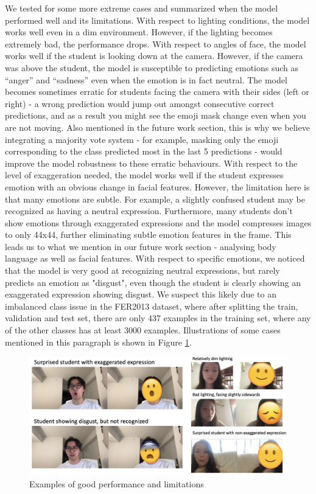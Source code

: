 \documentclass{article}
\begin{document}
We tested for some more extreme cases and summarized when the model performed well and its limitations. With respect to lighting conditions, the model works well even in a dim environment. However, if the lighting becomes extremely bad, the performance drops. With respect to angles of face, the model works well if the student is looking down at the camera. However, if the camera was above the student, the model is susceptible to predicting emotions such as ``anger'' and ``sadness'' even when the emotion is in fact neutral. The model becomes sometimes erratic for students facing the camera with their sides (left or right) - a wrong prediction would jump out amongst consecutive correct predictions, and as a result you might see the emoji mask change even when you are not moving. Also mentioned in the future work section, this is why we believe integrating a majority vote system - for example, masking only the emoji corresponding to the class predicted most in the last 5 predictions - would improve the model robustness to these erratic behaviours. With respect to the level of exaggeration needed, the model works well if the student expresses emotion with an obvious change in facial features. However, the limitation here is that many emotions are subtle. For example, a slightly confused student may be recognized as having a neutral expression. Furthermore, many students don't show emotions through exaggerated expressions and the model compresses images to only 44x44, further eliminating subtle emotion features in the frame. This leads us to what we mention in our future work section - analysing body language as well as facial features. With respect to specific emotions, we noticed that the model is very good at recognizing neutral expressions, but rarely predicts an emotion as "disgust", even though the student is clearly showing an exaggerated expression showing disgust. We suspect this likely due to an imbalanced class issue in the FER2013 dataset, where after splitting the train, validation and test set, there are only 437 examples in the training set, where any of the other classes has at least 3000 examples. Illustrations of some cases mentioned in this paragraph is shown in Figure \ref{fig:good and bads}.
\begin{figure}[]
    \centering
    \includegraphics[width=\textwidth]{figs/good_bad_eg.jpeg}
    \caption{Examples of good performance and limitations}
    \label{fig:good and bads}
\end{figure}
\end{document}
